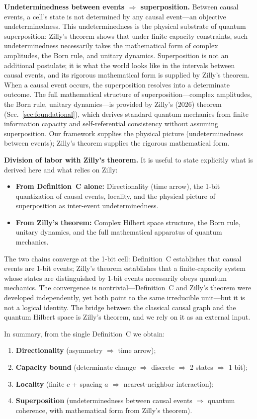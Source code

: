 \documentclass[aps,prd,twocolumn,showpacs,superscriptaddress,preprintnumbers]{revtex4-2}
\begin{document}
\textbf{Undeterminedness between events $\Rightarrow$ superposition.}
Between causal events, a cell's state is not determined by any causal event---an objective undeterminedness. This undeterminedness is the physical substrate of quantum superposition: Zilly's theorem shows that under finite capacity constraints, such undeterminedness necessarily takes the mathematical form of complex amplitudes, the Born rule, and unitary dynamics. Superposition is not an additional postulate; it is what the world looks like in the intervals between causal events, and its rigorous mathematical form is supplied by Zilly's theorem. When a causal event occurs, the superposition resolves into a determinate outcome. The full mathematical structure of superposition---complex amplitudes, the Born rule, unitary dynamics---is provided by Zilly's (2026) theorem (Sec.~\ref{sec:foundational}), which derives standard quantum mechanics from finite information capacity and self-referential consistency without assuming superposition. Our framework supplies the physical picture (undeterminedness between events); Zilly's theorem supplies the rigorous mathematical form.

\textbf{Division of labor with Zilly's theorem.}
It is useful to state explicitly what is derived here and what relies on Zilly:
\begin{itemize}
    \item \textbf{From Definition~C alone:} Directionality (time arrow), the 1-bit quantization of causal events, locality, and the physical picture of superposition as inter-event undeterminedness.
    \item \textbf{From Zilly's theorem:} Complex Hilbert space structure, the Born rule, unitary dynamics, and the full mathematical apparatus of quantum mechanics.
\end{itemize}
The two chains converge at the 1-bit cell: Definition~C establishes that causal events are 1-bit events; Zilly's theorem establishes that a finite-capacity system whose states are distinguished by 1-bit events necessarily obeys quantum mechanics. The convergence is nontrivial---Definition~C and Zilly's theorem were developed independently, yet both point to the same irreducible unit---but it is not a logical identity. The bridge between the classical causal graph and the quantum Hilbert space is Zilly's theorem, and we rely on it as an external input.

In summary, from the single Definition~C we obtain:
\begin{enumerate}
    \item \textbf{Directionality} (asymmetry $\Rightarrow$ time arrow);
    \item \textbf{Capacity bound} (determinate change $\Rightarrow$ discrete $\Rightarrow$ 2 states $\Rightarrow$ 1 bit);
    \item \textbf{Locality} (finite $c$ + spacing $a$ $\Rightarrow$ nearest-neighbor interaction);
    \item \textbf{Superposition} (undeterminedness between causal events $\Rightarrow$ quantum coherence, with mathematical form from Zilly's theorem).
\end{enumerate}
\end{document}

